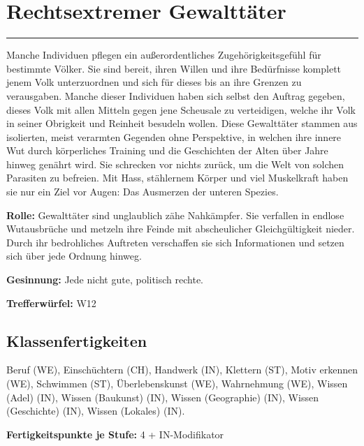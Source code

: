 \documentclass[
	ngerman,
	a4paper,
	11pt,
	twocolumn,
]{scrartcl}
\begin{document}
\section*{Rechtsextremer Gewalttäter}

\rule[2ex]{0.49\textwidth}{1pt}

Manche Individuen pflegen ein außerordentliches Zugehörigkeitsgefühl für bestimmte Völker. Sie sind bereit, ihren Willen und ihre Bedürfnisse komplett jenem Volk unterzuordnen und sich für dieses bis an ihre Grenzen zu verausgaben. Manche dieser Individuen haben sich selbst den Auftrag gegeben, dieses Volk mit allen Mitteln gegen jene Scheusale zu verteidigen, welche ihr Volk in seiner Obrigkeit und Reinheit besudeln wollen. Diese Gewalttäter stammen aus isolierten, meist verarmten Gegenden ohne Perspektive, in welchen ihre innere Wut durch körperliches Training und die Geschichten der Alten über Jahre hinweg genährt wird. Sie schrecken vor nichts zurück, um die Welt von solchen Parasiten zu befreien. Mit Hass, stählernem Körper und viel Muskelkraft haben sie nur ein Ziel vor Augen: Das Ausmerzen der unteren Spezies.

\textbf{Rolle:} Gewalttäter sind unglaublich zähe Nahkämpfer. Sie verfallen in endlose Wutausbrüche und metzeln ihre Feinde mit abscheulicher Gleichgültigkeit nieder. Durch ihr bedrohliches Auftreten verschaffen sie sich Informationen und setzen sich über jede Ordnung hinweg.

\textbf{Gesinnung:} Jede nicht gute, politisch rechte.

\textbf{Trefferwürfel:} W12

\subsection*{Klassenfertigkeiten}

Beruf (WE), Einschüchtern (CH), Handwerk (IN), Klettern (ST), Motiv erkennen (WE), Schwimmen (ST), Überlebenskunst (WE), Wahrnehmung (WE), Wissen (Adel) (IN), Wissen (Baukunst) (IN), Wissen (Geographie) (IN), Wissen (Geschichte) (IN), Wissen (Lokales) (IN).

\textbf{Fertigkeitspunkte je Stufe:} 4 + IN-Modifikator
\end{document}
